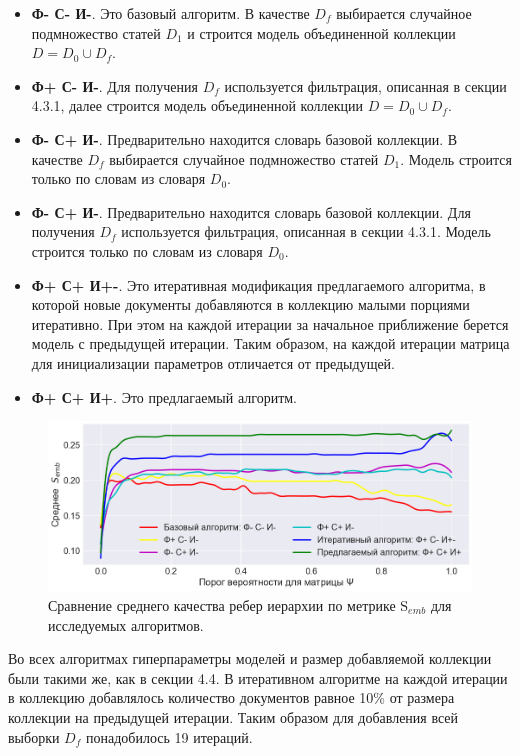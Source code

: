 \begin{itemize}
	\item \textbf{Ф- С- И-}. Это базовый алгоритм. В качестве $D_f$ выбирается случайное подмножество статей $D_1$ и строится модель объединенной коллекции $D = D_0 \cup D_f$. 
	\item \textbf{Ф+ С- И-}. Для получения $D_f$ используется фильтрация, описанная в секции 4.3.1, далее строится модель объединенной коллекции $D = D_0 \cup D_f$. 
	\item \textbf{Ф- С+ И-}. Предварительно находится словарь базовой коллекции. В качестве $D_f$ выбирается случайное подмножество статей $D_1$.  Модель строится только по словам из словаря $D_0$.
	\item \textbf{Ф- С+ И-}. Предварительно находится словарь базовой коллекции. Для получения $D_f$ используется фильтрация, описанная в секции 4.3.1. Модель строится только по словам из словаря $D_0$.
	\item \textbf{Ф+ С+ И+-}. Это итеративная модификация предлагаемого алгоритма, в которой новые документы добавляются в коллекцию малыми порциями итеративно. При этом на каждой итерации за начальное приближение берется модель с предыдущей итерации. Таким образом, на каждой итерации матрица для инициализации параметров отличается от предыдущей.
	\item \textbf{Ф+ С+ И+}. Это предлагаемый алгоритм.

\end{itemize}

\begin{figure}[h]
    \centering 
    \includegraphics[width=1\textwidth]{img/alg_comparison.png}
    \caption{\label{fig:alg_comparison}Сравнение среднего качества ребер иерархии по метрике $\mathrm{S}_{emb}$ для исследуемых алгоритмов.}
\end{figure}

Во всех алгоритмах гиперпараметры моделей и размер добавляемой коллекции были такими же, как в секции 4.4. В итеративном алгоритме на каждой итерации в коллекцию добавлялось количество документов равное 10\% от размера коллекции на предыдущей итерации. Таким образом для добавления всей выборки $D_f$ понадобилось 19 итераций.
